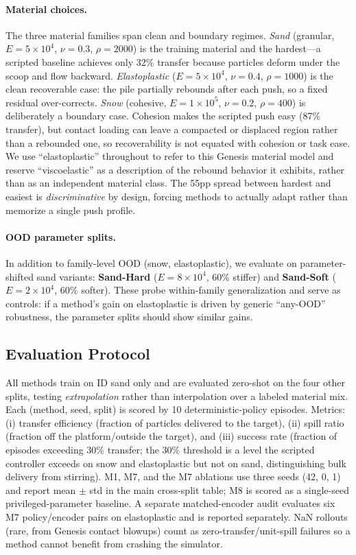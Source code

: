 \paragraph{Material choices.}
The three material families span clean and boundary regimes. \emph{Sand} (granular, $E=5 \times 10^4$, $\nu=0.3$, $\rho=2000$) is the training material and the hardest---a scripted baseline achieves only 32\% transfer because particles deform under the scoop and flow backward. \emph{Elastoplastic} ($E=5 \times 10^4$, $\nu=0.4$, $\rho=1000$) is the clean recoverable case: the pile partially rebounds after each push, so a fixed residual over-corrects. \emph{Snow} (cohesive, $E=1 \times 10^5$, $\nu=0.2$, $\rho=400$) is deliberately a boundary case. Cohesion makes the scripted push easy (87\% transfer), but contact loading can leave a compacted or displaced region rather than a rebounded one, so recoverability is not equated with cohesion or task ease. We use ``elastoplastic'' throughout to refer to this Genesis material model and reserve ``viscoelastic'' as a description of the rebound behavior it exhibits, rather than as an independent material class. The 55pp spread between hardest and easiest is \emph{discriminative} by design, forcing methods to actually adapt rather than memorize a single push profile.

\paragraph{OOD parameter splits.}
In addition to family-level OOD (snow, elastoplastic), we evaluate on parameter-shifted sand variants: \textbf{Sand-Hard} ($E=8 \times 10^4$, 60\% stiffer) and \textbf{Sand-Soft} ($E=2 \times 10^4$, 60\% softer). These probe within-family generalization and serve as controls: if a method's gain on elastoplastic is driven by generic ``any-OOD'' robustness, the parameter splits should show similar gains.

\subsection{Evaluation Protocol}

All methods train on ID sand only and are evaluated zero-shot on the four other splits, testing \emph{extrapolation} rather than interpolation over a labeled material mix. Each (method, seed, split) is scored by 10 deterministic-policy episodes. Metrics: (i) transfer efficiency (fraction of particles delivered to the target), (ii) spill ratio (fraction off the platform/outside the target), and (iii) success rate (fraction of episodes exceeding 30\% transfer; the 30\% threshold is a level the scripted controller exceeds on snow and elastoplastic but not on sand, distinguishing bulk delivery from stirring). M1, M7, and the M7 ablations use three seeds (42, 0, 1) and report mean $\pm$ std in the main cross-split table; M8 is scored as a single-seed privileged-parameter baseline. A separate matched-encoder audit evaluates six M7 policy/encoder pairs on elastoplastic and is reported separately. NaN rollouts (rare, from Genesis contact blowups) count as zero-transfer/unit-spill failures so a method cannot benefit from crashing the simulator.

